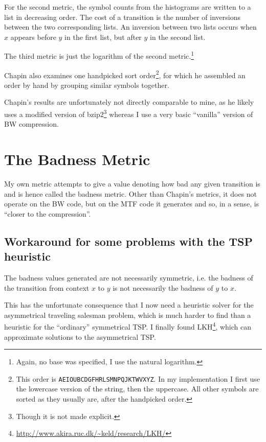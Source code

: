 \documentclass[a4paper]{scrreprt}
\begin{document}
For the second metric, the symbol counts from the histograms are written to a
list in decreasing order. The cost of a transition is the number of inversions
between the two corresponding lists. An inversion between two lists occurs when
\(x\) appears before \(y\) in the first list, but after \(y\) in the second
list.

The third metric is just the logarithm of the second metric.\footnote{Again, no
base was specified, I use the natural logarithm.}

Chapin also examines one handpicked sort order\footnote{This order is
\texttt{AEIOUBCDGFHRLSMNPQJKTWVXYZ}. In my implementation I first use the
lowercase version of the string, then the uppercase. All other symbols are
sorted as they usually are, after the handpicked order.}, for which he assembled
an order by hand by grouping similar symbols together.

Chapin's results are unfortunately not directly comparable to mine, as he likely
uses a modified version of bzip2\footnote{Though it is not made explicit.}
whereas I use a very basic ``vanilla'' version of BW compression.

\section{The Badness Metric}

My own metric attempts to give a value denoting how bad any given transition is
and is hence called the badness metric. Other than Chapin's metrics, it does not
operate on the BW code, but on the MTF code it generates and so, in a sense, is
``closer to the compression''.

\subsection{Workaround for some problems with the TSP heuristic}

The badness values generated are not necessarily symmetric, i.e. the badness of
the transition from context \(x\) to \(y\) is not necessarily the badness of
\(y\) to \(x\).

This has the unfortunate consequence that I now need a heuristic solver for the
asymmetrical traveling salesman problem, which is much harder to find than a
heuristic for the ``ordinary'' symmetrical TSP. I finally found
LKH\cite{helsgaun2000lkh}\footnote{\url{http://www.akira.ruc.dk/~keld/research/LKH/}},
which can approximate solutions to the asymmetrical TSP.
\end{document}

